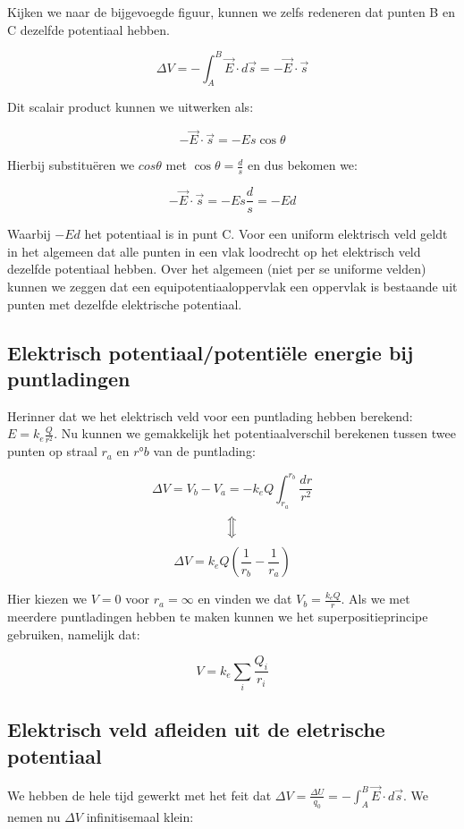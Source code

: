 \documentclass[12pt,a4paper]{article}
\newcommand{\Luda}{\Big\Updownarrow}
\begin{document}
    Kijken we naar de bijgevoegde figuur, kunnen we zelfs redeneren dat punten B en C dezelfde potentiaal hebben. 
    
    $$\Delta V = -\int_{A}^{B} \vec{E} \cdot d\vec{s} = -\vec{E} \cdot \vec{s}$$
    
    Dit scalair product kunnen we uitwerken als:
    
    $$-\vec{E} \cdot \vec{s} = -Es\cos{\theta}$$
    
    Hierbij substituëren we $cos{\theta}$ met $\cos{\theta} = \frac{d}{s}$ en dus bekomen we:
    
    $$-\vec{E} \cdot \vec{s} = -Es\frac{d}{s} = -Ed$$
    
    Waarbij $-Ed$ het potentiaal is in punt C. Voor een uniform elektrisch veld geldt in het algemeen dat
    alle punten in een vlak loodrecht op het elektrisch veld dezelfde potentiaal hebben. Over het algemeen (niet
    per se uniforme velden) kunnen we zeggen dat een equipotentiaaloppervlak een oppervlak is bestaande uit
    punten met dezelfde elektrische potentiaal.
    
    \subsection{Elektrisch potentiaal/potentiële energie bij puntladingen}
    Herinner dat we het elektrisch veld voor een puntlading hebben berekend: $E = k_{e} \frac{Q}{r^{2}}$. Nu kunnen we
    gemakkelijk het potentiaalverschil berekenen tussen twee punten op straal $r_{a}$ en $r°{b}$ van de puntlading: 
    
    $$\Delta V = V_{b} - V_{a} = -k_{e}Q\int_{r_a}^{r_b} \frac{dr}{r^{2}}$$
    $$\Luda$$
    $$\Delta V = k_{e}Q \left( \frac{1}{r_{b}} - \frac{1}{r_{a}} \right)$$
    
    Hier kiezen we $V = 0$ voor $r_{a} = \infty$ en vinden we dat $V_{b} = \frac{k_{e}Q}{r}$. Als we met
    meerdere puntladingen hebben te maken kunnen we het superpositieprincipe gebruiken, namelijk dat:
    
    $$V = k_{e}\sum_{i} \frac{Q_{i}}{r_{i}}$$

    \subsection{Elektrisch veld afleiden uit de eletrische potentiaal}
    We hebben de hele tijd gewerkt met het feit dat $\Delta V = \frac{\Delta U}{q_{0}} = -\int_{A}^{B} \vec{E} \cdot d\vec{s}$. We nemen
    nu $\Delta V$ infinitisemaal klein:
    
\end{document}
